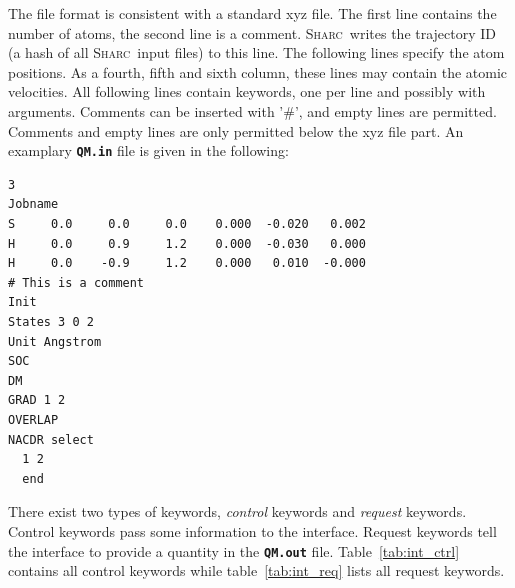 \documentclass[a4paper,10pt,DIV=15,openany,twoside=false]{scrbook}
\newcommand{\sharc}{\textsc{Sharc}}
\newcommand{\ttt}[1]{\textbf{\texttt{#1}}}
\newenvironment{example}{
  \setlength{\OuterFrameSep}{3pt}
  \vspace{0mm}
  \definecolor{shadecolor}{HTML}{E4F4FF}
  \begin{shaded}
}{
  \end{shaded}
}
\begin{document}
The file format is consistent with a standard xyz file. The first line contains the number of atoms, the second line is a comment. \sharc\ writes the trajectory ID (a hash of all \sharc\ input files) to this line. The following lines specify the atom positions. As a fourth, fifth and sixth column, these lines may contain the atomic velocities.
All following lines contain keywords, one per line and possibly with arguments. Comments can be inserted with '\#', and empty lines are permitted. Comments and empty lines are only permitted below the xyz file part.
An examplary \ttt{QM.in} file is given in the following:
\begin{example}
  \begin{verbatim}
3
Jobname
S     0.0     0.0     0.0    0.000  -0.020   0.002
H     0.0     0.9     1.2    0.000  -0.030   0.000
H     0.0    -0.9     1.2    0.000   0.010  -0.000
# This is a comment
Init
States 3 0 2
Unit Angstrom
SOC
DM
GRAD 1 2
OVERLAP
NACDR select
  1 2
  end
\end{verbatim}
\end{example}

There exist two types of keywords, \textit{control} keywords and \textit{request} keywords. Control keywords pass some information to the interface. Request keywords tell the interface to provide a quantity in the \ttt{QM.out} file. Table~\ref{tab:int_ctrl} contains all control keywords while table~\ref{tab:int_req} lists all request keywords.
\end{document}
